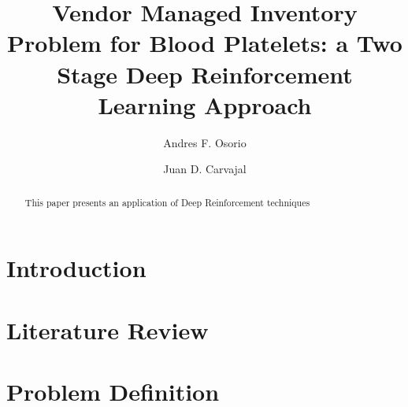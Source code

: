 \documentclass{elsarticle}
\begin{document}
\begin{frontmatter}

\title{Vendor Managed Inventory Problem for Blood Platelets: a Two Stage Deep Reinforcement Learning Approach}

\author[1]{Andres F. Osorio}
\author[2]{Juan D. Carvajal}


\address[1]{afosorio@icesi.edu.co}
\address[2]{juan030698@hotmail.com}


\begin{abstract}
	This paper presents an application of Deep Reinforcement techniques 
\end{abstract}


\end{frontmatter}


\section{Introduction}

\section{Literature Review}

\section{Problem Definition}
\end{document}
